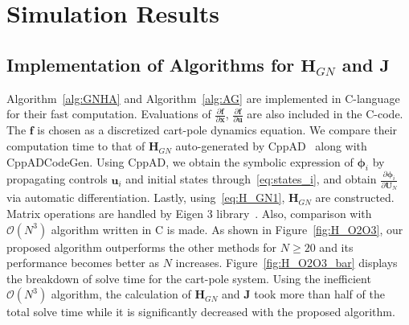 

\section{Simulation Results}
\label{sec:simulation}
\subsection{ Implementation of Algorithms for $\mathbf{H}_{GN}$ and $\mathbf{J}$}

Algorithm~\ref{alg:GNHA} and Algorithm~\ref{alg:AG} are implemented in C-language for their fast computation. Evaluations of $\frac{\partial \mathbf{f}}{\partial \mathbf{x}}$, $\frac{\partial \mathbf{f}}{\partial \mathbf{u}}$ are also included in the C-code. The $\mathbf{f}$ is chosen as a discretized cart-pole dynamics equation.
We compare their computation time to that of $\mathbf{H}_{GN}$ auto-generated by CppAD~\cite{bell2012cppad} along with CppADCodeGen. Using CppAD, we obtain the symbolic expression of $\boldsymbol{\phi}_i$ by propagating controls $\mathbf{u}_i$ and initial states through~\eqref{eq:states_i}, and obtain $\frac{\partial \boldsymbol{\phi}_i}{\partial \mathbf{U}_N}$ via automatic differentiation. Lastly, using~\eqref{eq:H_GN1}, $\mathbf{H}_{GN}$ are constructed. Matrix operations are handled by Eigen 3 library~\cite{eigenweb}. 
Also, comparison with $\mathcal{O}(N^3)$ algorithm written in C is made.  As shown in Figure~\eqref{fig:H_O2O3}, our proposed algorithm outperforms the other methods for $N\geq20$ and its performance becomes better as $N$ increases. %
Figure~\ref{fig:H_O2O3_bar} displays the breakdown of solve time for the cart-pole system. Using the inefficient $\mathcal{O}(N^3)$ algorithm, the calculation of  $\mathbf{H}_{GN}$ and $\mathbf{J}$ took more than half of the total solve time while it is significantly decreased with the proposed algorithm. 

